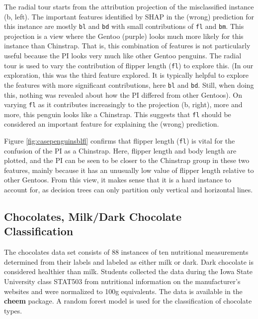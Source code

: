 \documentclass[11pt,twoside]{article}
\begin{document}
The radial tour starts from the attribution projection of the misclassified instance (b, left). The important features identified by SHAP in the (wrong) prediction for this instance are mostly \texttt{bl} and \texttt{bd} with small contributions of \texttt{fl} and \texttt{bm}. This projection is a view where the Gentoo (purple) looks much more likely for this instance than Chinstrap. That is, this combination of features is not particularly useful because the PI looks very much like other Gentoo penguins. The radial tour is used to vary the contribution of flipper length (\texttt{fl}) to explore this. (In our exploration, this was the third feature explored. It is typically helpful to explore the features with more significant contributions, here \texttt{bl} and \texttt{bd}. Still, when doing this, nothing was revealed about how the PI differed from other Gentoos). On varying \texttt{fl} as it contributes increasingly to the projection (b, right), more and more, this penguin looks like a Chinstrap. This suggests that \texttt{fl} should be considered an important feature for explaining the (wrong) prediction.

Figure \ref{fig:casepenguinsblfl} confirms that flipper length (\texttt{fl}) is vital for the confusion of the PI as a Chinstrap. Here, flipper length and body length are plotted, and the PI can be seen to be closer to the Chinstrap group in these two features, mainly because it has an unusually low value of flipper length relative to other Gentoos. From this view, it makes sense that it is a hard instance to account for, as decision trees can only partition only vertical and horizontal lines.

\hypertarget{chocolates-milkdark-chocolate-classification}{%
\subsection{Chocolates, Milk/Dark Chocolate Classification}\label{chocolates-milkdark-chocolate-classification}}

The chocolates data set consists of 88 instances of ten nutritional measurements determined from their labels and labeled as either milk or dark. Dark chocolate is considered healthier than milk. Students collected the data during the Iowa State University class STAT503 from nutritional information on the manufacturer's websites and were normalized to 100g equivalents. The data is available in the \textbf{cheem} package. A random forest model is used for the classification of chocolate types.
\end{document}
